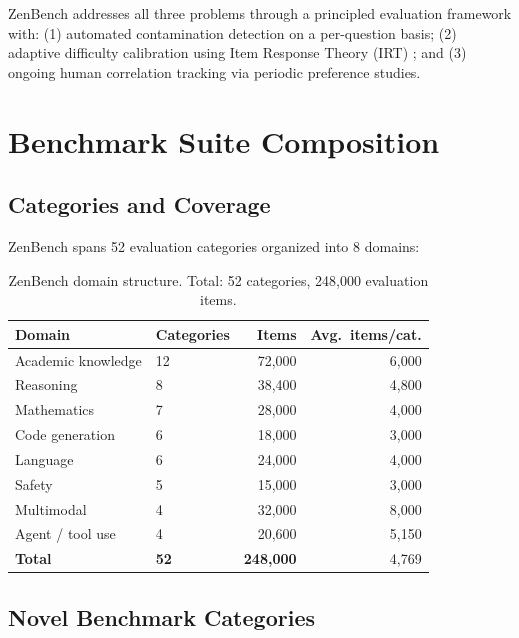 \documentclass[11pt,a4paper]{article}
\begin{document}
ZenBench addresses all three problems through a principled evaluation framework with:
(1) automated contamination detection on a per-question basis; (2) adaptive difficulty
calibration using Item Response Theory (IRT) \cite{embretson2000item}; and (3) ongoing
human correlation tracking via periodic preference studies.

\section{Benchmark Suite Composition}
\label{sec:composition}

\subsection{Categories and Coverage}

ZenBench spans 52 evaluation categories organized into 8 domains:

\begin{table}[H]
\centering
\caption{ZenBench domain structure. Total: 52 categories, 248,000 evaluation items.}
\begin{tabular}{llrr}
\toprule
\textbf{Domain} & \textbf{Categories} & \textbf{Items} & \textbf{Avg.\ items/cat.} \\
\midrule
Academic knowledge & 12 & 72,000 & 6,000 \\
Reasoning         & 8  & 38,400 & 4,800 \\
Mathematics       & 7  & 28,000 & 4,000 \\
Code generation   & 6  & 18,000 & 3,000 \\
Language          & 6  & 24,000 & 4,000 \\
Safety            & 5  & 15,000 & 3,000 \\
Multimodal        & 4  & 32,000 & 8,000 \\
Agent / tool use  & 4  & 20,600 & 5,150 \\
\midrule
\textbf{Total}    & \textbf{52} & \textbf{248,000} & 4,769 \\
\bottomrule
\end{tabular}
\label{tab:domains}
\end{table}

\subsection{Novel Benchmark Categories}
\end{document}
